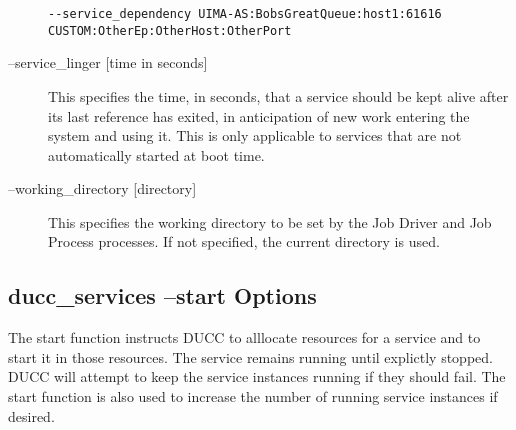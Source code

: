 \begin{description}
\begin{verbatim}
--service_dependency UIMA-AS:BobsGreatQueue:host1:61616 CUSTOM:OtherEp:OtherHost:OtherPort
\end{verbatim}
             
           \item[--service\_linger {[time in seconds]}] This specifies the time, in seconds, that a
             service should be kept alive after its last reference has exited, in anticipation of new work
             entering the system and using it. This is only applicable to services that are not
             automatically started at boot time. 
             
           \item[--working\_directory {[directory]}] This specifies the working directory to be set by the
             Job Driver and Job Process processes.  If not specified, the current directory is
             used.
       \end{description}


    \subsection{ducc\_services --start Options}

    The start function instructs DUCC to alllocate resources for a service and to start it in those
    resources. The service remains running until explictly stopped. DUCC will attempt to keep the
    service instances running if they should fail. The start function is also used to increase the
    number of running service instances if desired.
    
